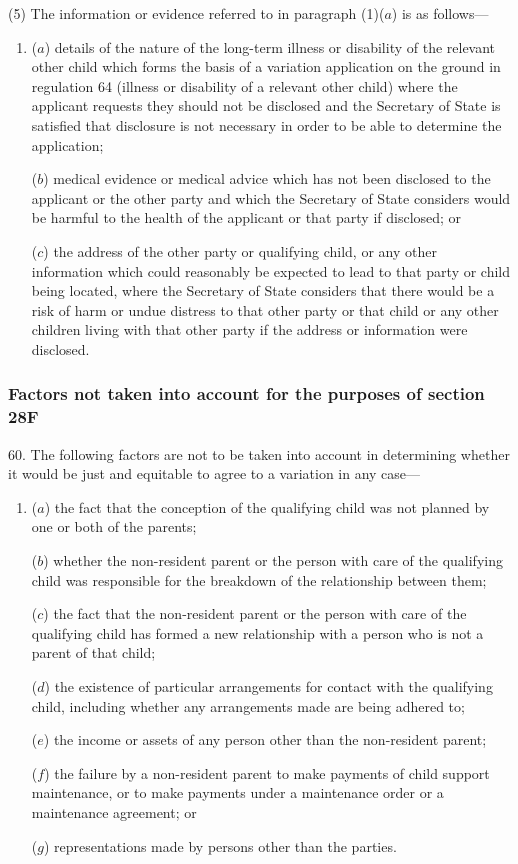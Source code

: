 \documentclass[12pt,a4paper]{article}
\begin{document}
(5) The information or evidence referred to in paragraph (1)($a$)  is as follows—
\begin{enumerate}\item[]
($a$) details of the nature of the long-term illness or disability of the relevant other child which forms the basis of a variation application on the ground in regulation 64 (illness or disability of a relevant other child) where the applicant requests they should not be disclosed and the Secretary of State is satisfied that disclosure is not necessary in order to be able to determine the application;

($b$) medical evidence or medical advice which has not been disclosed to the applicant or the other party and which the Secretary of State considers would be harmful to the health of the applicant or that party if disclosed; or

($c$) the address of the other party or qualifying child, or any other information which could reasonably be expected to lead to that party or child being located, where the Secretary of State considers that there would be a risk of harm or undue distress to that other party or that child or any other children living with that other party if the address or information were disclosed.
\end{enumerate}

\subsubsection[60. Factors not taken into account for the purposes of section 28F]{Factors not taken into account for the purposes of section 28F}

60.  The following factors are not to be taken into account in determining whether it would be just and equitable to agree to a variation in any case—
\begin{enumerate}\item[]
($a$) the fact that the conception of the qualifying child was not planned by one or both of the parents;

($b$) whether the non-resident parent or the person with care of the qualifying child was responsible for the breakdown of the relationship between them;

($c$) the fact that the non-resident parent or the person with care of the qualifying child has formed a new relationship with a person who is not a parent of that child;

($d$) the existence of particular arrangements for contact with the qualifying child, including whether any arrangements made are being adhered to;

($e$) the income or assets of any person other than the non-resident parent;

($f$) the failure by a non-resident parent to make payments of child support maintenance, or to make payments under a maintenance order or a maintenance agreement; or

($g$) representations made by persons other than the parties.
\end{enumerate}
\end{document}
